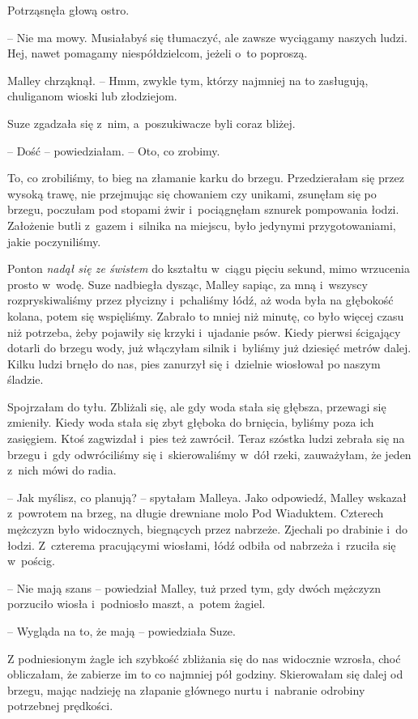 \documentclass[oneside,polish,11pt,sfheadings]{mwbk}
\begin{document}
Potrząsnęła głową ostro. 

-- Nie ma mowy. Musiałabyś się tłumaczyć, ale
zawsze wyciągamy naszych ludzi. Hej, nawet pomagamy niespółdzielcom,
jeżeli o~to poproszą.

Malley chrząknął. -- Hmm, zwykle tym, którzy najmniej na to zasługują,
chuliganom wioski lub złodziejom.

Suze zgadzała się z~nim, a~poszukiwacze byli coraz bliżej.

-- Dość -- powiedziałam. -- Oto, co zrobimy.

To, co zrobiliśmy, to bieg na złamanie karku do brzegu. Przedzierałam
się przez wysoką trawę, nie przejmując się chowaniem czy unikami,
zsunęłam się po brzegu, poczułam pod stopami żwir i~pociągnęłam sznurek
pompowania łodzi. Założenie butli z~gazem i~silnika na miejscu, było
jedynymi przygotowaniami, jakie poczyniliśmy.

Ponton \textit{nadął się ze świstem} do kształtu w~ciągu pięciu sekund,
mimo wrzucenia prosto w~wodę. Suze nadbiegła dysząc, Malley sapiąc, za
mną i~wszyscy rozpryskiwaliśmy przez płycizny i~pchaliśmy łódź, aż woda
była na głębokość kolana, potem się wspięliśmy. Zabrało to mniej niż
minutę, co było więcej czasu niż potrzeba, żeby pojawiły się krzyki i~ujadanie psów. Kiedy pierwsi ścigający dotarli do brzegu wody, już
włączyłam silnik i~byliśmy już dziesięć metrów dalej. Kilku ludzi brnęło
do nas, pies zanurzył się i~dzielnie wiosłował po naszym śladzie.

Spojrzałam do tyłu. Zbliżali się, ale gdy woda stała się głębsza,
przewagi się zmieniły. Kiedy woda stała się zbyt głęboka do brnięcia,
byliśmy poza ich zasięgiem. Ktoś zagwizdał i~pies też zawrócił. Teraz
szóstka ludzi zebrała się na brzegu i~gdy odwróciliśmy się i~skierowaliśmy w~dół rzeki, zauważyłam, że jeden z~nich mówi do radia.

-- Jak myślisz, co planują? -- spytałam Malleya. Jako odpowiedź, Malley
wskazał z~powrotem na brzeg, na długie drewniane molo Pod Wiaduktem.
Czterech mężczyzn było widocznych, biegnących przez nabrzeże. Zjechali
po drabinie i~do łodzi. Z~czterema pracującymi wiosłami, łódź odbiła od
nabrzeża i~rzuciła się w~pościg.

-- Nie mają szans -- powiedział Malley, tuż przed tym, gdy dwóch mężczyzn
porzuciło wiosła i~podniosło maszt, a~potem żagiel.

-- Wygląda na to, że mają -- powiedziała Suze.

Z podniesionym żagle ich szybkość zbliżania się do nas widocznie
wzrosła, choć obliczałam, że zabierze im to co najmniej pół godziny.
Skierowałam się dalej od brzegu, mając nadzieję na złapanie głównego
nurtu i~nabranie odrobiny potrzebnej prędkości.
\end{document}
